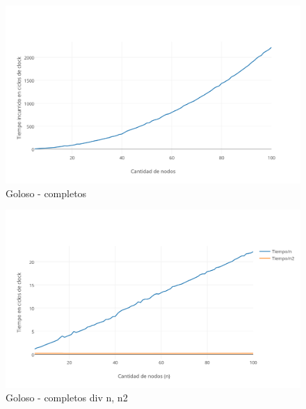 \begin{figure}[htb]
	\begin{center}
    		\includegraphics[scale=0.6]{imagenes/goloso-completos.png}
	\end{center}
	\caption{Goloso - completos\label{fig:2C}}
\end{figure}

\begin{figure}[htb]
	\begin{center}
    		\includegraphics[scale=0.6]{imagenes/goloso-completos-div.png}
	\end{center}
	\caption{Goloso - completos div n, n2\label{fig:2D}}
\end{figure}

